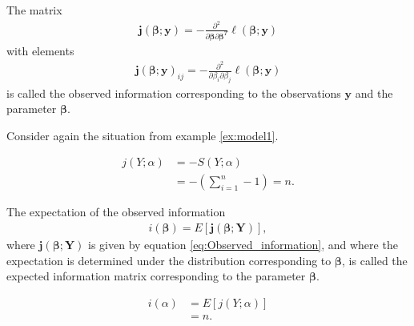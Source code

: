 \begin{definition} 
\label{def:observed_information}
The matrix
\begin{align} \label{eq:Observed_information}
    \textbf{j}(\boldsymbol{\beta};\textbf{y}) = - \frac{\partial^2}{\partial \boldsymbol{\beta} \partial \boldsymbol{\beta}^T} \ell(\boldsymbol{\beta}; \textbf{y})
\end{align}
with elements
\begin{align*}
    \textbf{j}(\boldsymbol{\beta};\textbf{y})_{ij} = - \frac{\partial^2}{\partial \beta_i \partial \beta_j} \ell(\boldsymbol{\beta}; \textbf{y})
\end{align*}
is called the observed information corresponding to the observations $\textbf{y}$ and the parameter $\boldsymbol{\beta}$.
\end{definition}

\begin{example}
    Consider again the situation from example \ref{ex:model1}.
    
    \begin{align*}
        j\left( Y; \alpha \right) &= - S\left(Y; \alpha \right)\\
        &=  - \left( \sum_{i = 1}^n -1\right) = n.
    \end{align*}
\end{example}

\begin{definition} 
\label{def:expected_information}
The expectation of the observed information 
\begin{align}
    i(\boldsymbol{\beta}) = E[\textbf{j}(\boldsymbol{\beta};\textbf{Y})],
\end{align}
where $\textbf{j}(\boldsymbol{\beta};\textbf{Y})$ is given by equation \eqref{eq:Observed_information}, and where the expectation is determined under the distribution corresponding to $\boldsymbol{\beta}$, is called the expected information matrix corresponding to the parameter $\boldsymbol{\beta}$.
\end{definition}

\begin{example}
    \begin{align*}
        i\left(\alpha \right) &= E\left[j(Y;\alpha)\right]\\
        &= n.
    \end{align*}
\end{example}

